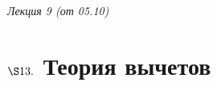\begin{flushright}
    \textit{Лекция 9 (от 05.10)}
\end{flushright}
\section{$\S 13.$ Теория вычетов}
